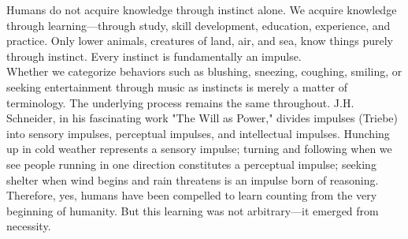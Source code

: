 Humans do not acquire knowledge through instinct alone. We acquire knowledge through learning—through study, skill development, education, experience, and practice. Only lower animals, creatures of land, air, and sea, know things purely through instinct. Every instinct is fundamentally an impulse.\\
Whether we categorize behaviors such as blushing, sneezing, coughing, smiling, or seeking entertainment through music as instincts is merely a matter of terminology. The underlying process remains the same throughout. J.H. Schneider, in his fascinating work "The Will as Power," divides impulses (Triebe) into sensory impulses, perceptual impulses, and intellectual impulses. Hunching up in cold weather represents a sensory impulse; turning and following when we see people running in one direction constitutes a perceptual impulse; seeking shelter when wind begins and rain threatens is an impulse born of reasoning. Therefore, yes, humans have been compelled to learn counting from the very beginning of humanity. But this learning was not arbitrary—it emerged from necessity.

